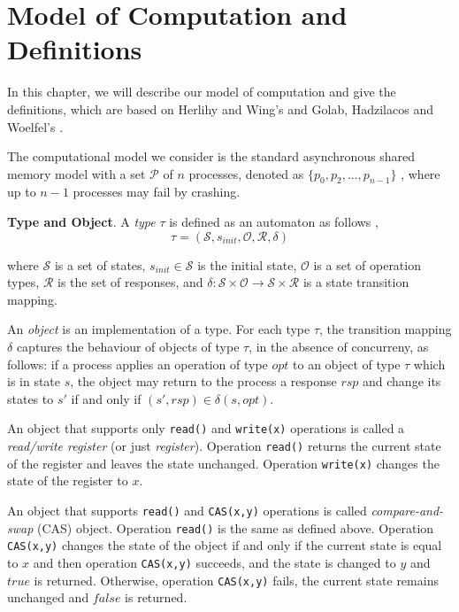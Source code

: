 
\chapter{Model of Computation and Definitions}
In this chapter, we will describe our model of computation and give the definitions, which are based on Herlihy
and Wing's \cite{Herlihy:1990:LCC:78969.78972} and Golab, Hadzilacos and Woelfel's \cite{InProc-GHHW2007a}.

The computational model we consider is the standard asynchronous shared memory model with a set $\mathcal{P}$
of $n$ processes, denoted as $\{p_0, p_2,...,p_{n-1}\}$ , where up to $n-1$ processes may fail by crashing.

\textbf{Type and Object}.
A \emph{type} $\tau$ is defined as an automaton as follows \cite{InProc-GHHW2007a},
$$\tau = (\mathcal{S}, s_{init},\mathcal{O},\mathcal{R} ,\delta )$$

where $\mathcal{S}$ is a set of states, $s_{init} \in \mathcal{S}$ is the initial state, $\mathcal{O}$ is a set of
operation types, $\mathcal{R}$ is the set of responses, and
$\delta :\mathcal{S} \times \mathcal{O} \to \mathcal{S} \times \mathcal{R}$ is a state transition mapping.

An \emph{object} is an implementation of a type. For each type $\tau$, the transition mapping $\delta$ captures the
behaviour of objects of type $\tau$, in the absence of concurreny,
as follows: if a process applies an operation of type $opt$ to an object of type $\tau$ which is in state $s$, the object
may return to the process a response $rsp$ and change its states to $s'$ if and only if $(s', rsp) \in \delta(s, opt)$.

An object that supports only \texttt{read()} and \texttt{write(x)} operations is called a \emph{read/write register}
(or just \emph{register}). Operation \texttt{read()} returns the current state of the register and leaves the state unchanged.
Operation \texttt{write(x)} changes the state of the register to $x$.

An object that supports \texttt{read()} and \texttt{CAS(x,y)} operations is called \emph{compare-and-swap} (CAS) object.
Operation \texttt{read()} is the same as defined above. Operation \texttt{CAS(x,y)} changes the state of
the object if and only if the current state is equal to $x$ and then operation \texttt{CAS(x,y)} succeeds, and the state is changed
to $y$ and $true$ is returned. Otherwise, operation \texttt{CAS(x,y)} fails, the current state remains unchanged and
$false$ is returned.

